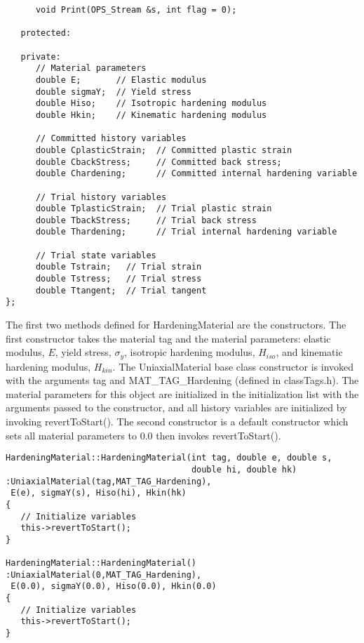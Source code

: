 \documentclass[12pt]{article}
\begin{document}
{{\begin{verbatim}
      void Print(OPS_Stream &s, int flag = 0);
    
   protected:
    
   private:
      // Material parameters
      double E;       // Elastic modulus
      double sigmaY;  // Yield stress
      double Hiso;    // Isotropic hardening modulus
      double Hkin;    // Kinematic hardening modulus

      // Committed history variables
      double CplasticStrain;  // Committed plastic strain
      double CbackStress;     // Committed back stress;
      double Chardening;      // Committed internal hardening variable

      // Trial history variables
      double TplasticStrain;  // Trial plastic strain
      double TbackStress;     // Trial back stress
      double Thardening;      // Trial internal hardening variable

      // Trial state variables
      double Tstrain;   // Trial strain
      double Tstress;   // Trial stress
      double Ttangent;  // Trial tangent
};
\end{verbatim}
}

\noindent The first two methods defined for HardeningMaterial are the constructors. The
first constructor takes the material tag and the material parameters: elastic modulus,
$E$, yield stress, $\sigma_y$, isotropic hardening modulus, $H_{iso}$, and kinematic
hardening modulus, $H_{kin}$. The UniaxialMaterial
base class constructor is invoked with the arguments tag and MAT\_TAG\_Hardening (defined
in classTags.h). The material parameters for this object are initialized in
the initialization list with the arguments passed to the constructor, and all
history variables are initialized by invoking revertToStart().
The second constructor is a default constructor which sets all
material parameters to $0.0$ then invokes revertToStart().

{\sf\small
\begin{verbatim}
HardeningMaterial::HardeningMaterial(int tag, double e, double s,
                                     double hi, double hk)
:UniaxialMaterial(tag,MAT_TAG_Hardening),
 E(e), sigmaY(s), Hiso(hi), Hkin(hk)
{
   // Initialize variables
   this->revertToStart();
}

HardeningMaterial::HardeningMaterial()
:UniaxialMaterial(0,MAT_TAG_Hardening),
 E(0.0), sigmaY(0.0), Hiso(0.0), Hkin(0.0)
{
   // Initialize variables
   this->revertToStart();
}
\end{verbatim}
}

}
\end{document}
